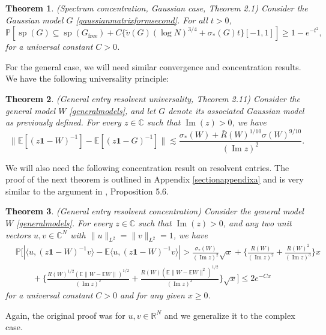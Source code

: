 \documentclass[11pt,reqno]{amsart}
\theoremstyle{plain}
\newtheorem{theorem}{Theorem}[section]
\theoremstyle{remark}
\numberwithin{equation}{section}
\begin{document}
\begin{theorem}\label{theorem2.3}(Spectrum concentration, Gaussian case, \cite{bandeira2023matrix} Theorem 2.1)\label{spectraluniversality}
   Consider the Gaussian model $G$ \eqref{gaussianmatrixformsecond}. For all $t>0$,
    $$
\mathbb{P}\left[ \operatorname{sp}(G)\subseteq \operatorname{sp}(G_{\text{free}})+C\{\tilde{v}(G)(\log N)^{3/4}+\sigma_*(G)t\}[-1,1]
\right]\geq 1-e^{-t^2},
    $$ for a universal constant $C>0$.
\end{theorem}

For the general case, we will need similar convergence and concentration results. We have the following universality principle:

\begin{theorem}(General entry resolvent universality, \cite{brailovskaya2022universality} Theorem 2.11) 
\label{theorem2.41} Consider the general model $W$ \eqref{generalmodels}, and let $G$ denote its associated Gaussian model as previously defined.
For every $z\in\mathbb{C}$ such that $\operatorname{Im}(z)>0$, we have
$$
\|\mathbb{E}[(z\mathbf{1}-W)^{-1}]-\mathbb{E}[(z\mathbf{1}-G)^{-1}]\|\lesssim \frac{\sigma_*(W)+\bar{R}(W)^{1/10}\sigma(W)^{9/10}}{(\operatorname{Im}z)^2}.
$$
\end{theorem}

We will also need the following concentration result on resolvent entries. The proof of the next theorem is outlined in Appendix \ref{sectionappendixa} and is very similar to the argument in \cite{brailovskaya2022universality}, Proposition 5.6.




\begin{theorem}\label{generalconcentration}(General entry resolvent concentration) Consider the general model $W$ \eqref{generalmodels}.
For every $z\in\mathbb{C}$ such that $\operatorname{Im}(z)>0$, and any two unit vectors $u,v\in\mathbb{C}^N$ with $\|u\|_{L^2}=\|v\|_{L^2}=1$, we have
$$\begin{aligned}
&\mathbb{P}[\left|\langle u,(z\mathbf{1}-W)^{-1}v\rangle-\mathbb{E}\langle u,(z\mathbf{1}-W)^{-1}v\rangle\right|> \frac{\sigma_*(W)}{(\operatorname{Im}z)^2}\sqrt{x}+\{\frac{R(W)}{(\operatorname{Im}z)^2}+\frac{R(W)^2}{(\operatorname{Im}z)^3}\}x\\&
\quad\quad +\{ \frac{R(W)^{1/2}(\mathbb{E}\|W-\mathbb{E}W\|)^{1/2}}{(\operatorname{Im}z)^2}+\frac{R(W)(\mathbb{E}\|W-\mathbb{E}W\|^2)^{1/2}}{(\operatorname{Im}z)^3}
\}\sqrt{x}
]\leq 2e^{-Cx}
\end{aligned}$$
for a universal constant $C>0$ and for any given $x\geq 0$.
\end{theorem}
Again, the original proof was for $u,v\in\mathbb{R}^N$ and we generalize it to the complex case.
\end{document}
